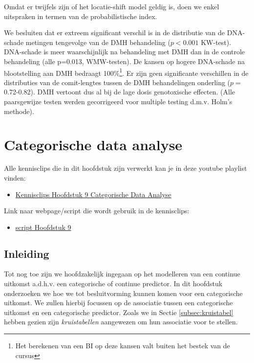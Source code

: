 \documentclass[
  12pt,dutch,coursenotes]{book}
\providecommand{\tightlist}{%
  \setlength{\itemsep}{0pt}\setlength{\parskip}{0pt}}
\theoremstyle{definition}
\theoremstyle{definition}
\theoremstyle{definition}
\theoremstyle{definition}
\theoremstyle{remark}
\begin{document}
Omdat er twijfels zijn of het locatie-shift model geldig is, doen we enkel uitspraken in termen van de probabilistische index.

We besluiten dat er extreem significant verschil is in de distributie van de DNA-schade metingen tengevolge van de DMH behandeling (\(p<0.001\) KW-test).
DNA-schade is meer waarschijnlijk na behandeling met DMH dan in de controle behandeling (alle p=0.013, WMW-testen).
De kansen op hogere DNA-schade na blootstelling aan DMH bedraagt 100\%\footnote{Het berekenen van een BI op deze kansen valt buiten het bestek van de cursus}.
Er zijn geen significante verschillen in de distributies van de comit-lengtes tussen de DMH behandelingen onderling (\(p=\) 0.72-0.82). DMH vertoont dus al bij de lage dosis genotoxische effecten. (Alle paarsgewijze testen werden gecorrigeerd voor multiple testing d.m.v. Holm's methode).

\hypertarget{chap-categorisch}{%
\chapter{Categorische data analyse}\label{chap-categorisch}}

Alle kennisclips die in dit hoofdstuk zijn verwerkt kan je in deze youtube playlist vinden:

\begin{itemize}
\tightlist
\item
  \href{https://www.youtube.com/playlist?list=PLZH1hP8_LbJJnNyz6IMPqq6fCMZJ63y8x}{Kennisclips Hoofdstuk 9 Categorische Data Analyse}
\end{itemize}

Link naar webpage/script die wordt gebruik in de kennisclips:

\begin{itemize}
\tightlist
\item
  \href{https://statomics.github.io/sbc21/rmd/09-categoricalDataAnalysis.html}{script Hoofdstuk 9}
\end{itemize}

\hypertarget{inleiding-8}{%
\section{Inleiding}\label{inleiding-8}}

Tot nog toe zijn we hoofdzakelijk ingegaan op het modelleren van een continue uitkomst a.d.h.v. een categorische of continue predictor.
In dit hoofdstuk onderzoeken we hoe we tot besluitvorming kunnen komen voor een categorische uitkomst.
We zullen hierbij focussen op de associatie tussen een categorische uitkomst en een categorische predictor.
Zoals we in Sectie \ref{subsec:kruistabel} hebben gezien zijn \emph{kruistabellen} aangewezen om hun associatie voor te stellen.
\end{document}
